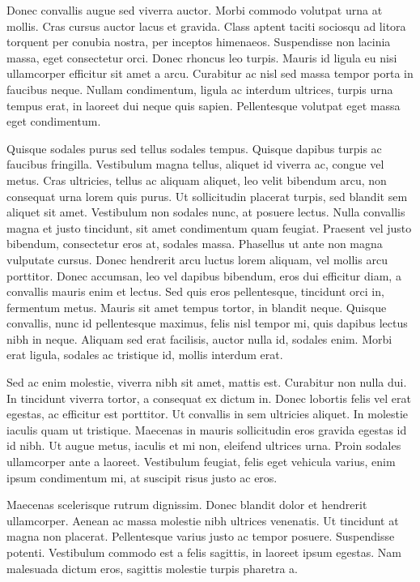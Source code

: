 \documentclass[a4paper,twoside,notitlepage,openright,11pt]{report}
\begin{document}
Donec convallis augue sed viverra auctor. Morbi commodo volutpat urna at mollis. Cras cursus auctor lacus et gravida. Class aptent taciti sociosqu ad litora torquent per conubia nostra, per inceptos himenaeos. Suspendisse non lacinia massa, eget consectetur orci. Donec rhoncus leo turpis. Mauris id ligula eu nisi ullamcorper efficitur sit amet a arcu. Curabitur ac nisl sed massa tempor porta in faucibus neque. Nullam condimentum, ligula ac interdum ultrices, turpis urna tempus erat, in laoreet dui neque quis sapien. Pellentesque volutpat eget massa eget condimentum.

Quisque sodales purus sed tellus sodales tempus. Quisque dapibus turpis ac faucibus fringilla. Vestibulum magna tellus, aliquet id viverra ac, congue vel metus. Cras ultricies, tellus ac aliquam aliquet, leo velit bibendum arcu, non consequat urna lorem quis purus. Ut sollicitudin placerat turpis, sed blandit sem aliquet sit amet. Vestibulum non sodales nunc, at posuere lectus. Nulla convallis magna et justo tincidunt, sit amet condimentum quam feugiat. Praesent vel justo bibendum, consectetur eros at, sodales massa. Phasellus ut ante non magna vulputate cursus. Donec hendrerit arcu luctus lorem aliquam, vel mollis arcu porttitor. Donec accumsan, leo vel dapibus bibendum, eros dui efficitur diam, a convallis mauris enim et lectus. Sed quis eros pellentesque, tincidunt orci in, fermentum metus. Mauris sit amet tempus tortor, in blandit neque. Quisque convallis, nunc id pellentesque maximus, felis nisl tempor mi, quis dapibus lectus nibh in neque. Aliquam sed erat facilisis, auctor nulla id, sodales enim. Morbi erat ligula, sodales ac tristique id, mollis interdum erat.

Sed ac enim molestie, viverra nibh sit amet, mattis est. Curabitur non nulla dui. In tincidunt viverra tortor, a consequat ex dictum in. Donec lobortis felis vel erat egestas, ac efficitur est porttitor. Ut convallis in sem ultricies aliquet. In molestie iaculis quam ut tristique. Maecenas in mauris sollicitudin eros gravida egestas id id nibh. Ut augue metus, iaculis et mi non, eleifend ultrices urna. Proin sodales ullamcorper ante a laoreet. Vestibulum feugiat, felis eget vehicula varius, enim ipsum condimentum mi, at suscipit risus justo ac eros.

Maecenas scelerisque rutrum dignissim. Donec blandit dolor et hendrerit ullamcorper. Aenean ac massa molestie nibh ultrices venenatis. Ut tincidunt at magna non placerat. Pellentesque varius justo ac tempor posuere. Suspendisse potenti. Vestibulum commodo est a felis sagittis, in laoreet ipsum egestas. Nam malesuada dictum eros, sagittis molestie turpis pharetra a.
\end{document}
